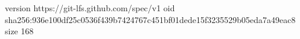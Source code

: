 version https://git-lfs.github.com/spec/v1
oid sha256:936e100df25c0536f439b7424767c451bf01dede15f3235529b05eda7a49eac8
size 168
